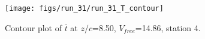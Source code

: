 \begin{figure}[H]
\centering
\texttt{[image: figs/run\_31/run\_31\_T\_contour]}
\caption{Contour plot of $\overline{t}$ at $z/c$=8.50, $V_{free}$=14.86, station 4.}
\label{fig:run_31_T_contour}
\end{figure}


